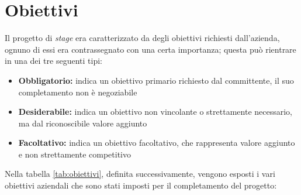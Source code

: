 \section{Obiettivi}\label{sec:objectives}\noindent
Il progetto di \textit{stage} era caratterizzato da degli obiettivi richiesti dall'azienda, ognuno di essi era contrassegnato con una certa importanza; questa può rientrare in una dei tre seguenti tipi:
\begin{itemize}
    \item \textbf{Obbligatorio:} indica un obiettivo primario richiesto dal committente, il suo completamento non è negoziabile
    \item \textbf{Desiderabile:} indica un obiettivo non vincolante o strettamente necessario, ma dal riconoscibile valore aggiunto
    \item \textbf{Facoltativo:} indica un obiettivo facoltativo, che rappresenta valore aggiunto e non strettamente competitivo
\end{itemize}
Nella tabella \ref{tab:obiettivi}, definita successivamente, vengono esposti i vari obiettivi aziendali che sono stati imposti per il completamento del progetto:
